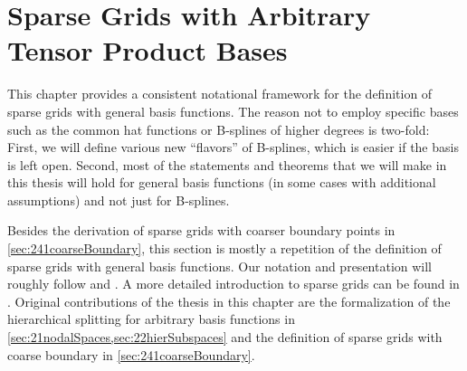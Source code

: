 
\chapter{Sparse Grids with Arbitrary Tensor Product Bases}
\label{chap:20sparseGrids}

This chapter provides a consistent notational framework
for the definition of sparse grids with general basis functions.
The reason not to employ specific bases such as the common hat functions
or B-splines of higher degrees is two-fold:
First, we will define various new ``flavors'' of B-splines,
which is easier if the basis is left open.
Second, most of the statements and theorems that we will make in this
thesis will hold for general basis functions
(in some cases with additional assumptions)
and not just for B-splines.

Besides the derivation of sparse grids with
coarser boundary points in \cref{sec:241coarseBoundary},
this section is mostly
a repetition of the definition of sparse grids with general basis functions.
Our notation and presentation will roughly follow
\cite{Pflueger10Spatially} and \cite{Garcke13Sparse}.
A more detailed introduction to sparse grids can be found in
\cite{Bungartz04Sparse}.
Original contributions of the thesis in this chapter
are the formalization of the hierarchical splitting for
arbitrary basis functions in \cref{sec:21nodalSpaces,sec:22hierSubspaces} and
the definition of sparse grids with coarse boundary in
\cref{sec:241coarseBoundary}.








\cleardoublepage
